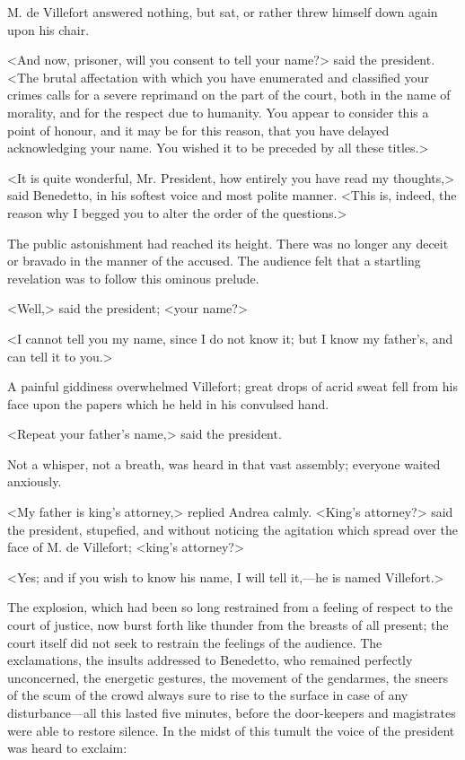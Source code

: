  M. de Villefort answered nothing, but sat, or rather threw himself down again upon his chair. 

 <And now, prisoner, will you consent to tell your name?> said the president. <The brutal affectation with which you have enumerated and classified your crimes calls for a severe reprimand on the part of the court, both in the name of morality, and for the respect due to humanity. You appear to consider this a point of honour, and it may be for this reason, that you have delayed acknowledging your name. You wished it to be preceded by all these titles.> 

 <It is quite wonderful, Mr. President, how entirely you have read my thoughts,> said Benedetto, in his softest voice and most polite manner. <This is, indeed, the reason why I begged you to alter the order of the questions.> 

 The public astonishment had reached its height. There was no longer any deceit or bravado in the manner of the accused. The audience felt that a startling revelation was to follow this ominous prelude. 

 <Well,> said the president; <your name?> 

 <I cannot tell you my name, since I do not know it; but I know my father's, and can tell it to you.> 

 A painful giddiness overwhelmed Villefort; great drops of acrid sweat fell from his face upon the papers which he held in his convulsed hand. 

 <Repeat your father's name,> said the president. 

 Not a whisper, not a breath, was heard in that vast assembly; everyone waited anxiously. 

 <My father is king's attorney,> replied Andrea calmly.  <King's attorney?> said the president, stupefied, and without noticing the agitation which spread over the face of M. de Villefort; <king's attorney?> 

 <Yes; and if you wish to know his name, I will tell it,—he is named Villefort.> 

 The explosion, which had been so long restrained from a feeling of respect to the court of justice, now burst forth like thunder from the breasts of all present; the court itself did not seek to restrain the feelings of the audience. The exclamations, the insults addressed to Benedetto, who remained perfectly unconcerned, the energetic gestures, the movement of the gendarmes, the sneers of the scum of the crowd always sure to rise to the surface in case of any disturbance—all this lasted five minutes, before the door-keepers and magistrates were able to restore silence. In the midst of this tumult the voice of the president was heard to exclaim: 

